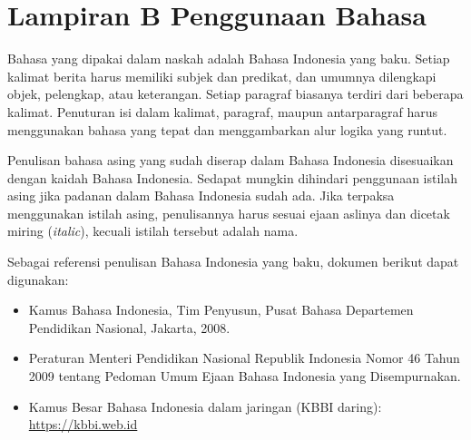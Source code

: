 
\chapter*{Lampiran B Penggunaan Bahasa}

Bahasa yang dipakai dalam naskah adalah Bahasa Indonesia yang baku.
Setiap kalimat berita harus memiliki subjek dan predikat, dan umumnya
dilengkapi objek, pelengkap, atau keterangan. Setiap paragraf biasanya
terdiri dari beberapa kalimat. Penuturan isi dalam kalimat, paragraf,
maupun antarparagraf harus menggunakan bahasa yang tepat dan
menggambarkan alur logika yang runtut.

Penulisan bahasa asing yang sudah diserap dalam Bahasa Indonesia
disesuaikan dengan kaidah Bahasa Indonesia. Sedapat mungkin dihindari
penggunaan istilah asing jika padanan dalam Bahasa Indonesia sudah ada.
Jika terpaksa menggunakan istilah asing, penulisannya harus sesuai ejaan
aslinya dan dicetak miring (\emph{italic}), kecuali istilah tersebut
adalah nama.

Sebagai referensi penulisan Bahasa Indonesia yang baku, dokumen berikut
dapat digunakan:

\begin{itemize}
  \item Kamus Bahasa Indonesia, Tim Penyusun, Pusat Bahasa Departemen
        Pendidikan Nasional, Jakarta, 2008.
  \item Peraturan Menteri Pendidikan Nasional Republik Indonesia Nomor
        46 Tahun 2009 tentang Pedoman Umum Ejaan Bahasa Indonesia yang
        Disempurnakan.
  \item Kamus Besar Bahasa Indonesia dalam jaringan (KBBI daring):
        \url{https://kbbi.web.id}
\end{itemize}
